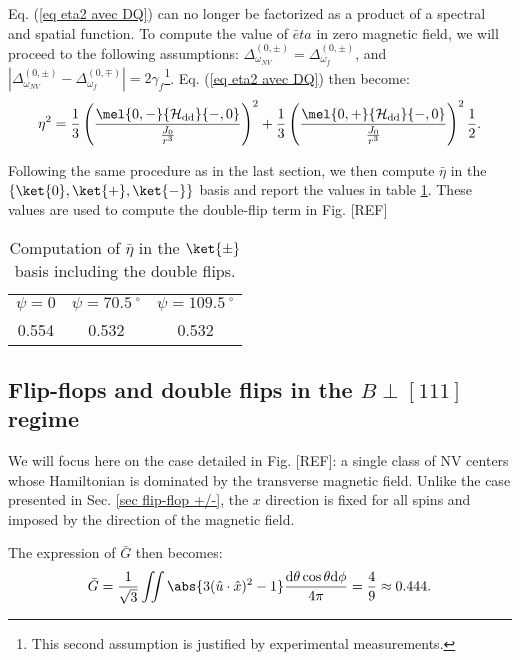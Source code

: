 \documentclass[a4paper, 11pt]{book}
\begin{document}
Eq. (\ref{eq eta2 avec DQ}) can no longer be factorized as a product of a spectral and spatial function. To compute the value of $\bar eta$ in zero magnetic field, we will proceed to the following assumptions: $\Delta_{\omega_{NV}}^{(0,\pm)}=\Delta_{\omega_{f}}^{(0,\pm)}$, and $|\Delta_{\omega_{NV}}^{(0,\pm)}-\Delta_{\omega_{f}}^{(0,\mp)}|=2 \gamma_f$\footnote{This second assumption is justified by experimental measurements.}. Eq. (\ref{eq eta2 avec DQ}) then become:
\begin{equation}
\eta^2=\frac{1}{3} \left(\frac{\mel{0,-}{\mathcal{H_{\rm dd}}}{-,0}}{\frac{J_0}{r^3}}\right)^2 
+\frac{1}{3} \left(\frac{\mel{0,+}{\mathcal{H_{\rm dd}}}{-,0}}{\frac{J_0}{r^3}}\right)^2 \frac{1}{2}.
\end{equation}

Following the same procedure as in the last section, we then compute $\bar \eta$ in the $\{ \ket{0}, \ket{+}, \ket{-}\}$ basis and report the values in table \ref{table eta double flip non mag}. These values are used to compute the double-flip term in Fig. [REF]

\begin{table}[htbp]
\centering
\caption{Computation of $\bar \eta$ in the $\ket{\pm}$ basis including the double flips.}
 \label{table eta double flip non mag}
\begin{tabular}{c|c|c}
\toprule
$\psi=0$ & $\psi=70.5 \ ^\circ$ & $\psi=109.5 \ ^\circ$ \\

0.554 & 0.532 & 0.532 \\
\bottomrule
\end{tabular}
\end{table}

\subsection{Flip-flops and double flips in the $B\perp [111]$ regime}

We will focus here on the case detailed in Fig. [REF]: a single class of NV centers whose Hamiltonian is dominated by the transverse magnetic field. Unlike the case presented in Sec. \ref{sec flip-flop +/-}, the $x$ direction is fixed for all spins and imposed by the direction of the magnetic field.

The expression of $\bar G$ then becomes:
\begin{equation}
\bar{G}= \frac{1}{\sqrt{3}}\iint \abs{3(\hat{u}\cdot\hat{x})^2 - 1} \frac{\rm d\theta \cos \theta \rm d\phi}{4 \pi}= \frac{4}{9}\approx 0.444.
\end{equation}
\end{document}
